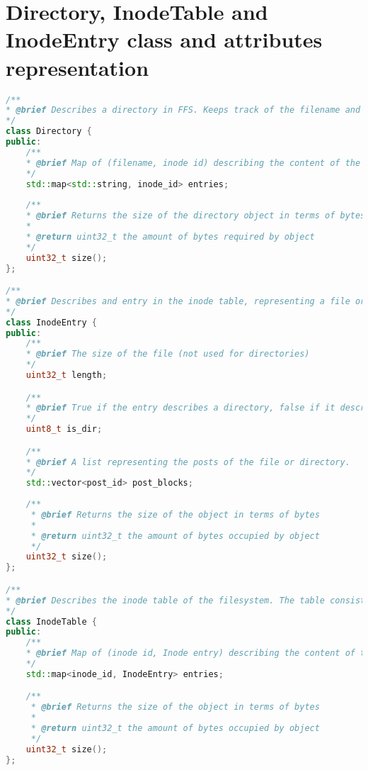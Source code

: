 \appendix
\renewcommand{\chaptermark}[1]{\markboth{Appendix \thechapter\relax:\thinspace\relax#1}{}}
\label{app:inode_dir_code}
\chapter{Directory, InodeTable and InodeEntry class and attributes representation}
\begin{lstlisting}[language=c++, caption={The attributes classes representing directories and the inode table in FFS}, label=lst:dir_itable_classes,breaklines=true]
/**
* @brief Describes a directory in FFS. Keeps track of the filename and inode of each file
*/
class Directory {
public:
	/**
	* @brief Map of (filename, inode id) describing the content of the directory
	*/
	std::map<std::string, inode_id> entries;
	
	/**
	* @brief Returns the size of the directory object in terms of bytes
	* 
	* @return uint32_t the amount of bytes required by object
	*/
	uint32_t size();
};

/**
* @brief Describes and entry in the inode table, representing a file or directory
*/
class InodeEntry {
public:
	/**
	* @brief The size of the file (not used for directories) 
	*/
	uint32_t length;

	/**
	* @brief True if the entry describes a directory, false if it describes a file
	*/
	uint8_t is_dir;

	/**
	* @brief A list representing the posts of the file or directory. 
	*/
	std::vector<post_id> post_blocks;
	
	/**
	 * @brief Returns the size of the object in terms of bytes
	 * 
	 * @return uint32_t the amount of bytes occupied by object
	 */
	uint32_t size();
};

/**
* @brief Describes the inode table of the filesystem. The table consists of multiple inode entries
*/
class InodeTable {
public:
	/**
	* @brief Map of (inode id, Inode entry) describing the content of the inode table
	*/
	std::map<inode_id, InodeEntry> entries;

	/**
	 * @brief Returns the size of the object in terms of bytes
	 * 
	 * @return uint32_t the amount of bytes occupied by object
	 */
	uint32_t size();
};

\end{lstlisting}